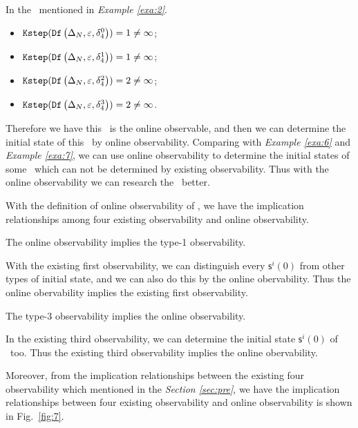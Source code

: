 \begin{example}
In the \BCN\ mentioned in {\em Example \ref{exa:2}}.  
 \begin{itemize}
 \item ${\tt Kstep}({\tt Df}\left(\Delta_N,\varepsilon, \delta_{4}^0\right))=1\ne \infty$;
 \item ${\tt Kstep}({\tt Df}\left(\Delta_N,\varepsilon, \delta_{4}^1\right))=1\ne \infty$;
 \item ${\tt Kstep}({\tt Df}\left(\Delta_N,\varepsilon, \delta_{4}^2\right))=2\ne \infty$;
 \item ${\tt Kstep}({\tt Df}\left(\Delta_N,\varepsilon, \delta_{4}^3\right))=2\ne \infty$.
 \end{itemize}
 
Therefore we have this \BCN\ is the online observable, and then we can determine the initial state of this \BCN\ by online observability. Comparing with {\em Example \ref{exa:6}} and {\em Example \ref{exa:7}}, we can use online observability to determine the initial states of some \BCNs\ which can not be determined by existing observability. Thus with the online observability we can research the \BCNs\ better.
\label{exa:10}
\end{example}  

With the definition of online observability of \BCNs, we have the implication relationships among four existing observability and online observability.

\begin{lemma}
The online observability implies the  type-1 observability.
\label{lemm:3}
\end{lemma}

With the existing first observability, we can distinguish every $\mathsf{s}^{i}(0)$ from other types of initial state, and we can also do this by the online obervability. Thus the online obervability implies the existing first observability. 

\begin{lemma}
The  type-3 observability implies the online observability.
\label{lemm:4}
\end{lemma}

In the existing third observability, we can determine the initial state $\mathsf{s}^{i}(0)$ of \BCN\ too. Thus the existing third observability implies the online obervability.

Moreover, from the implication relationships between the existing four observability which mentioned in the {\em Section \ref{sec:pre}}, we have the implication relationships between four existing observability and online observability is shown in Fig.~\ref{fig:7}.

